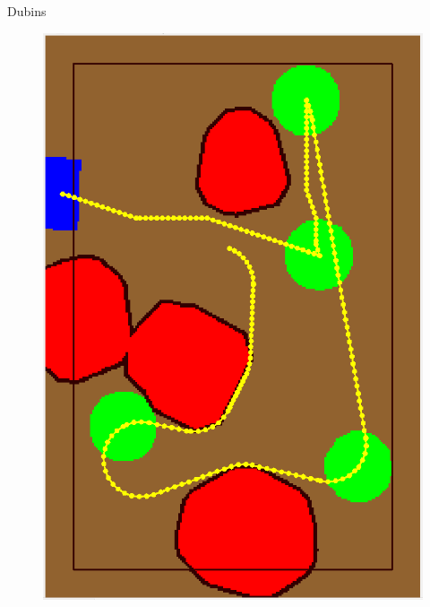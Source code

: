 \begin{frame}[fragile]{Dubins}
\begin{figure}[H]
	\begin{minipage}{0.45\linewidth}
		\includegraphics[scale=0.19]{Immagini/map2}
	\end{minipage}
	\vspace{0.10\linewidth}
	\begin{minipage}{0.45\linewidth}

\end{minipage}
\end{figure}
\end{frame}
